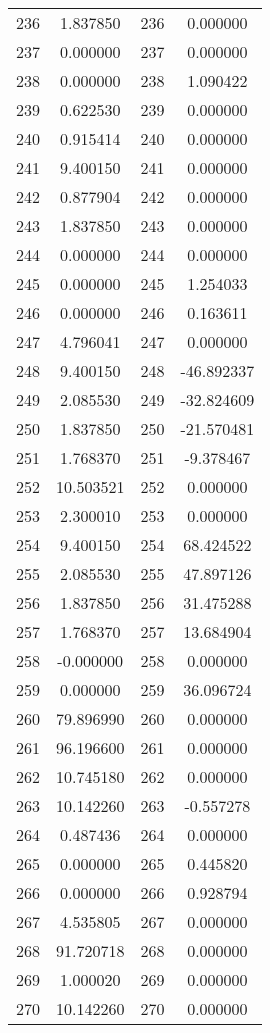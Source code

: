\documentclass[12pt]{article}
\begin{document}
\begin{longtable}{@{}cccc@{}}
236 & 1.837850 & 236 & 0.000000 \\
237 & 0.000000 & 237 & 0.000000 \\
238 & 0.000000 & 238 & 1.090422 \\
239 & 0.622530 & 239 & 0.000000 \\
240 & 0.915414 & 240 & 0.000000 \\
241 & 9.400150 & 241 & 0.000000 \\
242 & 0.877904 & 242 & 0.000000 \\
243 & 1.837850 & 243 & 0.000000 \\
244 & 0.000000 & 244 & 0.000000 \\
245 & 0.000000 & 245 & 1.254033 \\
246 & 0.000000 & 246 & 0.163611 \\
247 & 4.796041 & 247 & 0.000000 \\
248 & 9.400150 & 248 & -46.892337 \\
249 & 2.085530 & 249 & -32.824609 \\
250 & 1.837850 & 250 & -21.570481 \\
251 & 1.768370 & 251 & -9.378467 \\
252 & 10.503521 & 252 & 0.000000 \\
253 & 2.300010 & 253 & 0.000000 \\
254 & 9.400150 & 254 & 68.424522 \\
255 & 2.085530 & 255 & 47.897126 \\
256 & 1.837850 & 256 & 31.475288 \\
257 & 1.768370 & 257 & 13.684904 \\
258 & -0.000000 & 258 & 0.000000 \\
259 & 0.000000 & 259 & 36.096724 \\
260 & 79.896990 & 260 & 0.000000 \\
261 & 96.196600 & 261 & 0.000000 \\
262 & 10.745180 & 262 & 0.000000 \\
263 & 10.142260 & 263 & -0.557278 \\
264 & 0.487436 & 264 & 0.000000 \\
265 & 0.000000 & 265 & 0.445820 \\
266 & 0.000000 & 266 & 0.928794 \\
267 & 4.535805 & 267 & 0.000000 \\
268 & 91.720718 & 268 & 0.000000 \\
269 & 1.000020 & 269 & 0.000000 \\
270 & 10.142260 & 270 & 0.000000 \\

\end{longtable}
\end{document}
